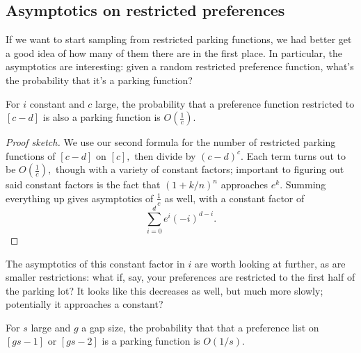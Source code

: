 \subsection*{Asymptotics on restricted preferences}

If we want to start sampling from restricted parking functions, we had better get a good idea of how many of them there are in the first place. In particular, the asymptotics are interesting: given a random restricted preference function, what's the probability that it's a parking function?

\begin{proposition}
    For $i$ constant and $c$ large, the probability that a preference function restricted to $[c-d]$ is also a parking function is $O\left(\frac{1}{c}\right).$
\end{proposition}

\begin{proof}[Proof sketch]
    We use our second formula for the number of restricted parking functions of $[c-d]$ on $[c],$ then divide by $(c-d)^c.$ Each term turns out to be $O\left(\frac{1}{c}\right),$ though with a variety of constant factors; important to figuring out said constant factors is the fact that $(1+k/n)^n$ approaches $e^k.$ Summing everything up gives asymptotics of $\frac{1}{c}$ as well, with a constant factor of $$\sum_{i=0}^d e^i(-i)^{d-i}.$$
\end{proof}

The asymptotics of this constant factor in $i$ are worth looking at further, as are smaller restrictions: what if, say, your preferences are restricted to the first half of the parking lot? It looks like this decreases as well, but much more slowly; potentially it approaches a constant?

\begin{proposition}
    For $s$ large and $g$ a gap size, the probability that that a preference list on $[gs-1]$ or $[gs-2]$ is a parking function is $O(1/s).$
\end{proposition}

